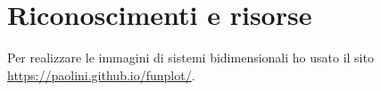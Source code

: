 \chapter{Riconoscimenti e risorse}
Per realizzare le immagini di sistemi bidimensionali ho usato il sito \url{https://paolini.github.io/funplot/}.